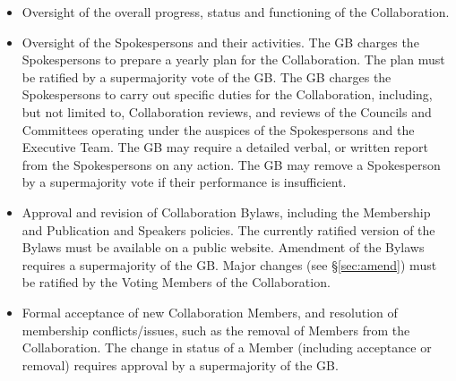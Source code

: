 \documentclass[12pt]{article}
\newcommand{\exec}{{Executive Team}}
\begin{document}
\begin{itemize}
\item Oversight of the overall progress, status and functioning of the Collaboration.  

\item Oversight of the Spokespersons and their activities.  The GB charges the Spokespersons to prepare a yearly plan for the Collaboration.  The plan must be ratified by a supermajority vote of the GB.  The GB charges the Spokespersons to carry out specific duties for the Collaboration, including, but not limited to, Collaboration reviews, and reviews of the Councils and Committees operating under the auspices of the Spokespersons and the \exec.  The GB may require a detailed verbal, or written report from the Spokespersons on any action. The GB may remove a Spokesperson by a supermajority vote if their performance is insufficient. %



\item Approval and revision of Collaboration Bylaws, including the Membership and Publication and Speakers policies.   
\textcolor{\markcolor} {The currently ratified version of the Bylaws must be available on a public website.}
Amendment of the Bylaws requires a supermajority of the GB.  Major changes (see \textcolor{\markcolor}{\S\ref{sec:amend}}) must be ratified by the Voting Members of the Collaboration.  %



\item Formal acceptance of new Collaboration Members, and resolution of membership conflicts/issues, such as the removal of Members from the Collaboration. The change in status of a Member (including acceptance or removal) requires approval by a supermajority of the GB.


\end{itemize}
\end{document}
